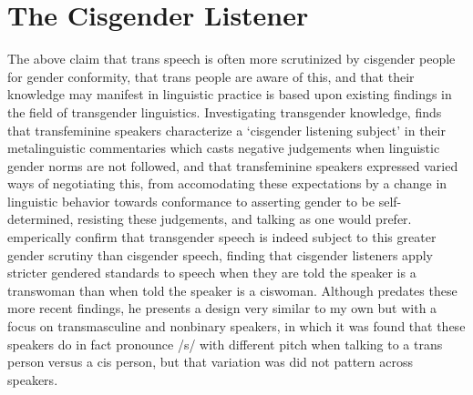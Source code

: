 \section{The Cisgender Listener}
The above claim that trans speech is often more scrutinized by cisgender people for gender conformity, that trans people are aware of this, and that their knowledge may manifest in linguistic practice is based upon existing findings in the field of transgender linguistics. Investigating transgender knowledge, \textcite{heffernan_constructing_2023} finds that transfeminine speakers characterize a `cisgender listening subject' in their metalinguistic commentaries which casts negative judgements when linguistic gender norms are not followed, and that transfeminine speakers expressed varied ways of negotiating this, from accomodating these expectations by a change in linguistic behavior towards conformance to asserting gender to be self-determined, resisting these judgements, and talking as one would prefer.  \textcite{jessee_cisgender_2025} emperically confirm that transgender speech is indeed subject to this greater gender scrutiny than cisgender speech, finding that cisgender listeners apply stricter gendered standards to speech when they are told the speaker is a transwoman than when told the speaker is a ciswoman. Although \textcite{parnell-mooney_transgender_2019} predates these more recent findings, he presents a design very similar to my own but with a focus on transmasculine and nonbinary speakers, in which it was found that these speakers do in fact pronounce /s/ with different pitch when talking to a trans person versus a cis person, but that variation was did not pattern across speakers.  

